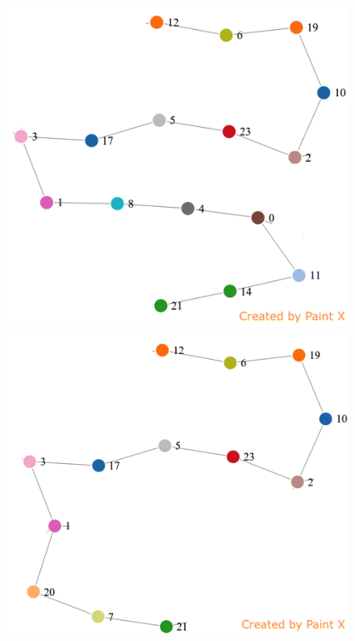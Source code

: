 \documentclass[11pt]{article}
\begin{document}
\begin{figure}
	{\includegraphics[scale=0.28]{./pics/paths/3.png}}
	{\includegraphics[scale=0.28]{./pics/paths/4.png}}

\end{figure}
\end{document}
